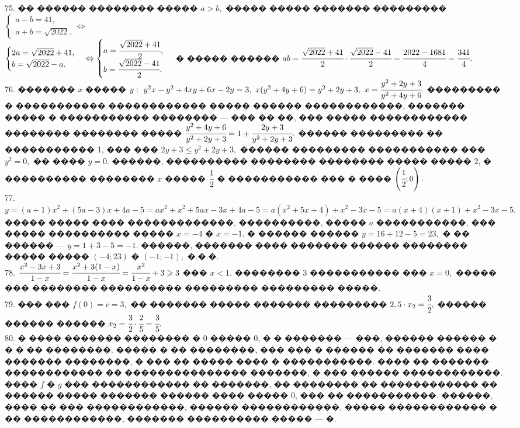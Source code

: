 \documentclass[12pt]{article}
\begin{document}
75. �� ������ �������� ����� $a>b,$ ����� ����� ������� ��������� $\begin{cases} a-b=41,\\ a+b=\sqrt{2022}.\end{cases}\Leftrightarrow$\\$ \begin{cases} 2a=\sqrt{2022}+41,\\ b=\sqrt{2022}-a.\end{cases}\Leftrightarrow\begin{cases} a=\cfrac{\sqrt{2022}+41}{2},\\ b=\cfrac{\sqrt{2022}-41}{2}.\end{cases}$ � ����� ������ $ab=\cfrac{\sqrt{2022}+41}{2}\cdot\cfrac{\sqrt{2022}-41}{2}=\cfrac{2022-1681}{4}=\cfrac{341}{4}.$\\
76. ������� $x$ ����� $y:\ y^2x-y^2+4xy+6x-2y=3,\ x(y^2+4y+6)=y^2+2y+3,\ x=\cfrac{y^2+2y+3}{y^2+4y+6}.$ ��������� � ����������� ������������ ����� ������ ������������, ������� ����� � ����������� �������� --- ��� �� ��, ��� ����� ������������ �������� �������� ����� $\cfrac{y^2+4y+6}{y^2+2y+3}=1+\cfrac{2y+3}{y^2+2y+3}.$ ������ ��������� �� ����������� 1, ��� ��� $2y+3\leqslant y^2+2y+3,$ ������ ��������� ����������� ��� $y^2=0,$ �� ���� $y=0.$ ������, ���������� �������� �������� ����� ����� 2, � ���������� �������� $x$ ����� $\cfrac{1}{2}$ � ����������� ��� � ���� $\left(\cfrac{1}{2};0\right).$\\
77. $y=(a+1)x^2+(5a-3)x+4a-5=ax^2+x^2+5ax-3x+4a-5=a(x^2+5x+4)+x^2-3x-5=a(x+4)(x+1)+x^2-3x-5.$ ����� ����� ���� �������������, ����������, ����� $a$ �����������, ��� ����� ���������� ����� $x=-4$ � $x=-1.$ � ������ ������ $y=16+12-5=23,$ � �� ������ --- $y=1+3-5=-1.$ ������, ������� ���� ������� ������ �������� ����� ����� $(-4;23)$ � $(-1;-1),$ �.�.�.\\
78. $\cfrac{x^2-3x+3}{1-x}=\cfrac{x^2+3(1-x)}{1-x}=\cfrac{x^2}{1-x}+3\geqslant3$ ��� $x<1.$ �������� 3 ����������� ��� $x=0,$ ����� ��� �������� ���������� ��������� ��������� �����.\\
79. ��� ��� $f(0)=c=3,$ �� ������� ����� ������� ��������� $2,5\cdot x_2=\cfrac{3}{2},$ ������ ������ ������ $x_2=\cfrac{3}{2}\cdot\cfrac{2}{5}=\cfrac{3}{5}.$\\
80. � ���� ������� �������� � 0 ����� 0, � � ������� --- ���, ������ ������ � � � �� ��������. ����� � �� ��������, ��� ��� � ������ �� ������� ���� ������� ��������, � ��� �� ����� ���� � �����������. ���� �� ������� ������������ �� ��������������� �������, � ��� ������ ������������. ���� $f$ � $g$ ��� ������������ �� �������, �� �������� �� ������������ �� ������ ����� ������� ������ ���� ����� 0, ��� �� �����������. ������, ���� �� ��� ������������, ������ ������������, ����� ������������ � �� ������������, ������� ���������� ����� --- �.\\
\end{document}
